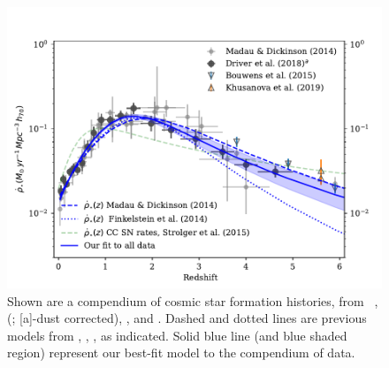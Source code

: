 \documentclass[apj]{aastex62}
\begin{document}
\begin{figure}[h]
   \centering
   \includegraphics[width=6.1in]{figure_csfh_today}
   \caption{\footnotesize Shown are a compendium of cosmic star formation histories, from ~\cite{Madau:2014fk}, \citeauthor{Driver:2018nr} (\citeyear{Driver:2018nr}; [a]-dust corrected), \cite{Bouwens:2015qy}, and \cite{Khusanova:2019kx}. Dashed and dotted lines are previous models  from \cite{Madau:2014fk}, \cite{Finkelstein:2014fj}, \cite{Strolger:2015aa}, as indicated. Solid blue line (and blue shaded region) represent our best-fit model to the compendium of data.}
   \label{fig:csfhs}
\end{figure}
\end{document}
